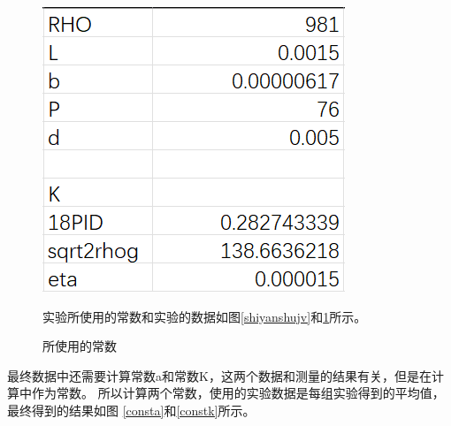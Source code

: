 \documentclass{ctexart}
\begin{document}
  \begin{figure}[H]
    \begin{minipage}[t]{0.4\textwidth}
      \centering
      \includegraphics[width=\linewidth]{changshu.png}
      \caption{所使用的常数}\label{changshu}
    \end{minipage}%
    \hfill
    \begin{minipage}[t]{0.6\textwidth}
      实验所使用的常数和实验的数据如图\ref{shiyanshujv}和\ref{changshu}所示。
    \end{minipage}
  \end{figure}

  最终数据中还需要计算常数a和常数K，这两个数据和测量的结果有关，但是在计算中作为常数。
  所以计算两个常数，使用的实验数据是每组实验得到的平均值，最终得到的结果如图
  \ref{consta}和\ref{constk}所示。
\end{document}

